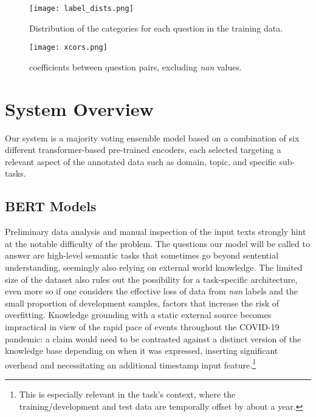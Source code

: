 \documentclass[11pt,a4paper]{article}
\begin{document}
\begin{figure}
    \centering
    \texttt{[image: label\_dists.png]}
    \caption{Distribution of the categories for each question in the training data.}
    \label{fig:labels_fig}
\end{figure}

\begin{figure}
    \centering
    \texttt{[image: xcors.png]}
    \caption{ coefficients between question pairs, excluding \textit{nan} values.}
    \label{fig:xcors}
\end{figure}
    
\section{System Overview}
Our system is a majority voting ensemble model based on a combination of six different transformer-based pre-trained encoders, each selected targeting a relevant aspect of the annotated data such as domain, topic, and specific sub-tasks.

\subsection{BERT Models}

Preliminary data analysis and manual inspection of the input texts strongly hint at the notable difficulty of the problem.
The questions our model will be called to answer are high-level semantic tasks that sometimes go beyond sentential understanding, seemingly also relying on external world knowledge.
The limited size of the dataset also rules out the possibility for a task-specific architecture, even more so if one considers the effective loss of data from \textit{nan} labels and the small proportion of development samples, factors that increase the risk of overfitting.
Knowledge grounding with a static external source becomes impractical in view of the rapid pace of events throughout the COVID-19 pandemic: a claim would need to be contrasted against a distinct version of the knowledge base depending on when it was expressed, inserting significant overhead and necessitating an additional timestamp input feature.\footnote{This is especially relevant in the task's context, where the training/development and test data are temporally offset by about a year.}
\end{document}

